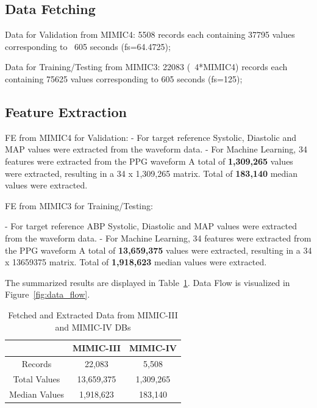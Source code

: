 \subsection{Data Fetching}
\label{subsec:data_fetching}

Data for Validation from MIMIC4:
5508 records each containing 37795 values corresponding to ~605 seconds (fs=64.4725);

Data for Training/Testing from MIMIC3:
22083 (~4*MIMIC4) records each containing 75625 values corresponding to 605 seconds (fs=125);

\subsection{Feature Extraction}
\label{subsec:feature_extraction}

FE from MIMIC4 for Validation:
- For target reference Systolic, Diastolic and MAP values were extracted from the waveform data.
- For Machine Learning, 34 features were extracted from the PPG waveform
A total of \textbf{1,309,265} values were extracted, resulting in a 34 x 1,309,265 matrix.
Total of \textbf{183,140} median values were extracted.

FE from MIMIC3 for Training/Testing:

- For target reference ABP Systolic, Diastolic and MAP values were extracted from the waveform data.
- For Machine Learning, 34 features were extracted from the PPG waveform
A total of \textbf{13,659,375} values were extracted, resulting in a 34 x 13659375 matrix.
Total of \textbf{1,918,623} median values were extracted.

The summarized results are displayed in Table~\ref{tab:records}.
Data Flow is visualized in Figure~\ref{fig:data_flow}.

\begin{table}{\textwidth}
    \renewcommand{\arraystretch}{1.5} %
    \setlength{\tabcolsep}{12pt} %
    \begin{center}
        \begin{tabular}{ |c|c|c| }
            \hline
            & MIMIC-III  & MIMIC-IV  \\
            \hline
            Records       & 22,083     & 5,508     \\
            \hline
            Total Values  & 13,659,375 & 1,309,265 \\
            \hline
            Median Values & 1,918,623  & 183,140   \\
            \hline
        \end{tabular}
    \end{center}
    \captionsetup{format=plain, justification=centering}
    \caption{Fetched and Extracted Data from MIMIC-III and MIMIC-IV DBs}
    \label{tab:records}
\end{table}

